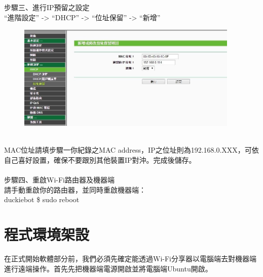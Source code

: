 \documentclass{article}
\begin{document}
\\
\\
\\
\\
\\步驟三、進行IP預留之設定
\\“進階設定” -> “DHCP” -> “位址保留” -> “新增”
\begin{figure}[htp]
    \begin{center}
        \includegraphics[width=300pt]{pic/圖片15.jpg}
    \end{center}
\end{figure}
\\MAC位址請填步驟一你紀錄之MAC address，IP之位址則為192.168.0.XXX，可依自己喜好設置，確保不要跟別其他裝置IP對沖。完成後儲存。
\\
\\步驟四、重啟Wi-Fi路由器及機器端
\\請手動重啟你的路由器，並同時重啟機器端：
\\duckiebot \$ sudo reboot

\section{程式環境架設}
在正式開始軟體部分前，我們必須先確定能透過Wi-Fi分享器以電腦端去對機器端進行遠端操作。首先先把機器端電源開啟並將電腦端Ubuntu開啟。
\end{document}
